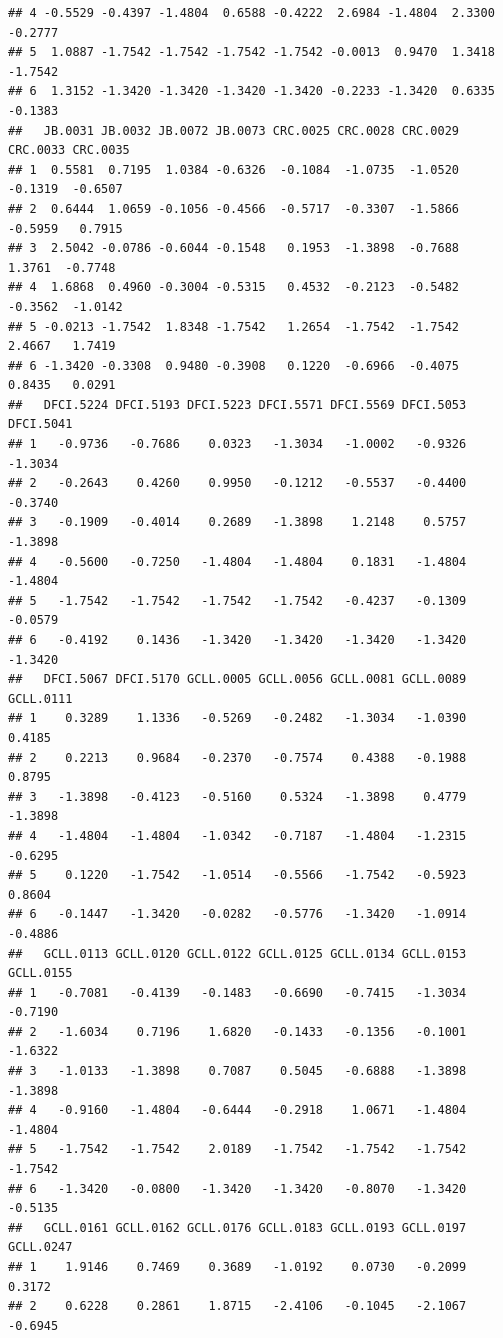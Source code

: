 \documentclass[
]{article}
\begin{document}
\begin{verbatim}
## 4 -0.5529 -0.4397 -1.4804  0.6588 -0.4222  2.6984 -1.4804  2.3300 -0.2777
## 5  1.0887 -1.7542 -1.7542 -1.7542 -1.7542 -0.0013  0.9470  1.3418 -1.7542
## 6  1.3152 -1.3420 -1.3420 -1.3420 -1.3420 -0.2233 -1.3420  0.6335 -0.1383
##   JB.0031 JB.0032 JB.0072 JB.0073 CRC.0025 CRC.0028 CRC.0029 CRC.0033 CRC.0035
## 1  0.5581  0.7195  1.0384 -0.6326  -0.1084  -1.0735  -1.0520  -0.1319  -0.6507
## 2  0.6444  1.0659 -0.1056 -0.4566  -0.5717  -0.3307  -1.5866  -0.5959   0.7915
## 3  2.5042 -0.0786 -0.6044 -0.1548   0.1953  -1.3898  -0.7688   1.3761  -0.7748
## 4  1.6868  0.4960 -0.3004 -0.5315   0.4532  -0.2123  -0.5482  -0.3562  -1.0142
## 5 -0.0213 -1.7542  1.8348 -1.7542   1.2654  -1.7542  -1.7542   2.4667   1.7419
## 6 -1.3420 -0.3308  0.9480 -0.3908   0.1220  -0.6966  -0.4075   0.8435   0.0291
##   DFCI.5224 DFCI.5193 DFCI.5223 DFCI.5571 DFCI.5569 DFCI.5053 DFCI.5041
## 1   -0.9736   -0.7686    0.0323   -1.3034   -1.0002   -0.9326   -1.3034
## 2   -0.2643    0.4260    0.9950   -0.1212   -0.5537   -0.4400   -0.3740
## 3   -0.1909   -0.4014    0.2689   -1.3898    1.2148    0.5757   -1.3898
## 4   -0.5600   -0.7250   -1.4804   -1.4804    0.1831   -1.4804   -1.4804
## 5   -1.7542   -1.7542   -1.7542   -1.7542   -0.4237   -0.1309   -0.0579
## 6   -0.4192    0.1436   -1.3420   -1.3420   -1.3420   -1.3420   -1.3420
##   DFCI.5067 DFCI.5170 GCLL.0005 GCLL.0056 GCLL.0081 GCLL.0089 GCLL.0111
## 1    0.3289    1.1336   -0.5269   -0.2482   -1.3034   -1.0390    0.4185
## 2    0.2213    0.9684   -0.2370   -0.7574    0.4388   -0.1988    0.8795
## 3   -1.3898   -0.4123   -0.5160    0.5324   -1.3898    0.4779   -1.3898
## 4   -1.4804   -1.4804   -1.0342   -0.7187   -1.4804   -1.2315   -0.6295
## 5    0.1220   -1.7542   -1.0514   -0.5566   -1.7542   -0.5923    0.8604
## 6   -0.1447   -1.3420   -0.0282   -0.5776   -1.3420   -1.0914   -0.4886
##   GCLL.0113 GCLL.0120 GCLL.0122 GCLL.0125 GCLL.0134 GCLL.0153 GCLL.0155
## 1   -0.7081   -0.4139   -0.1483   -0.6690   -0.7415   -1.3034   -0.7190
## 2   -1.6034    0.7196    1.6820   -0.1433   -0.1356   -0.1001   -1.6322
## 3   -1.0133   -1.3898    0.7087    0.5045   -0.6888   -1.3898   -1.3898
## 4   -0.9160   -1.4804   -0.6444   -0.2918    1.0671   -1.4804   -1.4804
## 5   -1.7542   -1.7542    2.0189   -1.7542   -1.7542   -1.7542   -1.7542
## 6   -1.3420   -0.0800   -1.3420   -1.3420   -0.8070   -1.3420   -0.5135
##   GCLL.0161 GCLL.0162 GCLL.0176 GCLL.0183 GCLL.0193 GCLL.0197 GCLL.0247
## 1    1.9146    0.7469    0.3689   -1.0192    0.0730   -0.2099    0.3172
## 2    0.6228    0.2861    1.8715   -2.4106   -0.1045   -2.1067   -0.6945

\end{verbatim}
\end{document}
